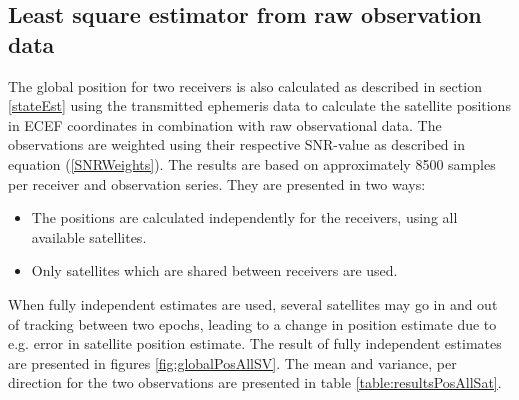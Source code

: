 \subsection{Least square estimator from raw observation data}\label{leastSquareEstimator}
The global position for two receivers is also calculated as described in section \ref{stateEst} using the transmitted ephemeris data to calculate the satellite positions in ECEF coordinates in combination with raw observational data. The observations are weighted using their respective SNR-value as described in equation (\ref{SNRWeights}).
The results are based on approximately 8500 samples per receiver and observation series. They are presented in two ways:
\begin{itemize}
\item The positions are calculated independently for the receivers, using all available satellites.
\item Only satellites which are shared between receivers are used.
\end{itemize}
When fully independent estimates are used, several satellites may go in and out of tracking between two epochs, leading to a change in position estimate due to e.g. error in satellite position estimate. The result of fully independent estimates are presented in figures \ref{fig:globalPosAllSV}. The mean and variance, per direction for the two observations are presented in table \ref{table:resultsPosAllSat}.
